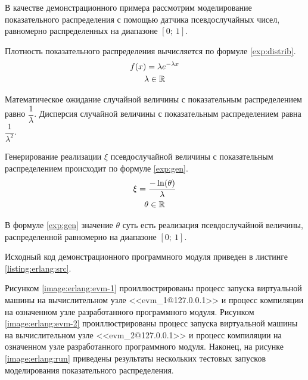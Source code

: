 
В качестве демонстрационного примера рассмотрим моделирование показательного распределения с помощью датчика псевдослучайных чисел, равномерно распределенных на диапазоне $[0 ;~ 1]$.

Плотность показательного распределения вычисляется по формуле \eqref{exp:distrib}.
\begin{gather}
	f(x) = \lambda e^{- \lambda x} \label{exp:distrib} \\
	\lambda \in \mathbb{R} \notag
\end{gather}

Математическое ожидание случайной величины с показательным распределением равно $\dfrac{1}{\lambda}$. Дисперсия случайной величины с показательным распределением равна $\dfrac{1}{\lambda ^ 2}$.

Генерирование реализации $\xi$ псевдослучайной величины с показательным распределением происходит по формуле \eqref{exp:gen}.
\begin{gather}
	\xi = \frac{- \ln(\theta)}{\lambda} \label{exp:gen} \\
	\theta \in \mathbb{R} \notag
\end{gather}

В формуле \eqref{exp:gen} значение $\theta$ суть есть реализация псевдослучайной величины, распределенной равномерно на диапазоне $[0 ;~ 1]$.

Исходный код демонстрационного программного модуля приведен в листинге \ref{listing:erlang:src}.

Рисунком \ref{image:erlang:evm-1} проиллюстрированы процесс запуска виртуальной машины на вычислительном узле <<evm\_1@127.0.0.1>> и процесс компиляции на означенном узле разработанного программного модуля. Рисунком \ref{image:erlang:evm-2} проиллюстрированы процесс запуска виртуальной машины на вычислительном узле <<evm\_2@127.0.0.1>> и процесс компиляции на означенном узле разработанного программного модуля. Наконец, на рисунке \ref{image:erlang:run} приведены результаты нескольких тестовых запусков моделирования показательного распределения.


\begin{landscape}


\end{landscape}

